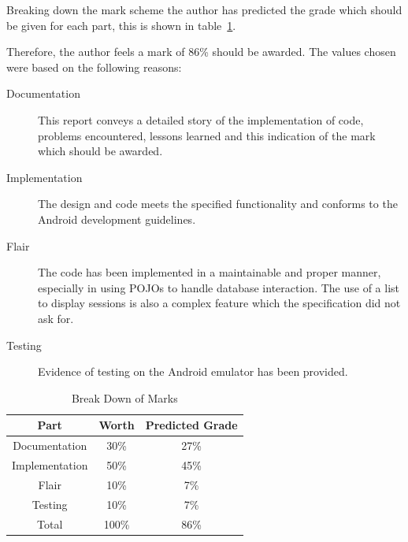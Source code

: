 \documentclass[11pt, a4paper]{article}
\begin{document}
Breaking down the mark scheme the author has predicted the grade which should 
be given for each part, this is shown in table~\ref{tab:marks}.

Therefore, the author feels a mark of 86\% should be awarded. The values chosen 
were based on the following reasons:

\begin{description}
\item[Documentation] This report conveys a detailed story of the implementation
                     of code, problems encountered, lessons learned and this 
                     indication of the mark which should be awarded.
\item[Implementation] The design and code meets the specified functionality and
                      conforms to the Android development guidelines.
\item[Flair] The code has been implemented in a maintainable and proper manner,
             especially in using POJOs to handle database interaction. The use
             of a list to display sessions is also a complex feature which the
             specification did not ask for.
\item[Testing] Evidence of testing on the Android emulator has been provided.
\end{description}

\begin{table}[h]
\centering
\begin{tabular}{|c|c|c|}\hline
\textbf{Part} & \textbf{Worth} & \textbf{Predicted Grade} \\ \hline
Documentation & 30\% & 27\% \\ 
Implementation & 50\% & 45\% \\ 
Flair & 10\% & 7\% \\ 
Testing & 10\% & 7\% \\ \hline
Total & 100\% & 86\% \\ \hline
\end{tabular}
\caption{Break Down of Marks}\label{tab:marks}
\end{table}

\newpage



\end{document}
